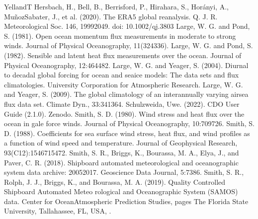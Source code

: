 \documentclass[letterpaper,10pt,english]{sphinxmanual}
\begin{document}
\begin{sphinxthebibliography}{YellandT}
\sphinxAtStartPar
Hersbach, H., Bell, B., Berrisford, P., Hirahara, S., Horányi, A., Muñoz\sphinxhyphen{}Sabater, J., et al. (2020). The ERA5 global reanalysis. Q. J. R. Meteorological Soc. 146, 1999\textendash{}2049. doi: 10.1002/qj.3803
\sphinxAtStartPar
Large, W. G. and Pond, S. (1981). Open ocean momentum flux measurements in moderate to strong winds. Journal of Physical Oceanography, 11(324\textendash{}336).
\sphinxAtStartPar
Large, W. G. and Pond, S. (1982). Sensible and latent heat flux measurements over the ocean. Journal of Physical Oceanography, 12:464\textendash{}482.
\sphinxAtStartPar
Large, W. G. and Yeager, S. (2004). Diurnal to decadal global forcing for ocean and sea\sphinxhyphen{}ice models: The data sets and flux climatologies. University Corporation for Atmospheric Research.
\sphinxAtStartPar
Large, W. G. and Yeager, S. (2009). The global climatology of an interannually varying air\textendash{}sea flux data set. Climate Dyn., 33:341\textendash{}364.
\sphinxAtStartPar
Schulzweida, Uwe. (2022). CDO User Guide (2.1.0). Zenodo. 
\sphinxAtStartPar
Smith, S. D. (1980). Wind stress and heat flux over the ocean in gale force winds. Journal of Physical Oceanography, 10:709\textendash{}726.
\sphinxAtStartPar
Smith, S. D. (1988). Coefficients for sea surface wind stress, heat flux, and wind profiles as a function of wind speed and temperature. Journal of Geophysical Research, 93(C12):15467\textendash{}15472.
\sphinxAtStartPar
Smith, S. R., Briggs, K., Bourassa, M. A., Elya, J., and Paver, C. R. (2018). Shipboard automated meteorological and oceanographic system data archive: 2005\textendash{}2017. Geoscience Data Journal, 5:73\textendash{}86.
\sphinxAtStartPar
Smith, S. R., Rolph, J. J., Briggs, K., and Bourassa, M. A. (2019). Quality Controlled Shipboard Automated Meteo\sphinxhyphen{} rological and Oceanographic System (SAMOS) data. Center for Ocean\sphinxhyphen{}Atmospheric Prediction Studies, pages The Florida State University, Tallahassee, FL, USA, .

\end{sphinxthebibliography}
\end{document}
